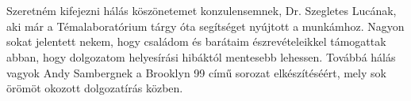 \chapter*{\koszonetnyilvanitas}

Szeretném kifejezni hálás köszönetemet konzulensemnek, Dr. Szegletes Lucának, aki már a Témalaboratórium tárgy óta segítséget nyújtott a munkámhoz. Nagyon sokat jelentett nekem, hogy családom és barátaim észrevételeikkel támogattak abban, hogy dolgozatom helyesírási hibáktól mentesebb lehessen. Továbbá hálás vagyok Andy Sambergnek a Brooklyn 99 című sorozat elkészítéséért, mely sok örömöt okozott dolgozatírás közben.